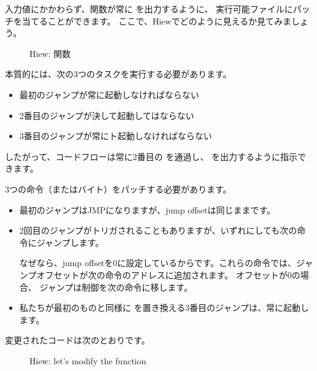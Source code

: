 



\clearpage
{}

入力値にかかわらず、関数が常に を出力するように、
実行可能ファイルにパッチを当てることができます。 
ここで、Hiewでどのように見えるか見てみましょう。

\begin{figure}[H]
\centering
{}
\caption{Hiew:  関数}
\label{fig:jcc_hiew_1}
\end{figure}

本質的には、次の3つのタスクを実行する必要があります。
\begin{itemize}
\item 最初のジャンプが常に起動しなければならない
\item 2番目のジャンプが決して起動してはならない
\item 3番目のジャンプが常にト起動しなければならない
\end{itemize}

したがって、コードフローは常に2番目の \printf を通過し、 を出力するように指示できます。 

3つの命令（またはバイト）をパッチする必要があります。

\begin{itemize}
\item 最初のジャンプはJMPになりますが、\gls{jump offset}は同じままです。

\item 
2回目のジャンプがトリガされることもありますが、いずれにしても次の命令にジャンプします。

なぜなら、\gls{jump offset}を0に設定しているからです。これらの命令では、ジャンプオフセットが次の命令のアドレスに追加されます。 
オフセットが0の場合、
ジャンプは制御を次の命令に移します。

\item 
私たちが最初のものと同様に \JMP を置き換える3番目のジャンプは、常に起動します。

\end{itemize}

\clearpage
変更されたコードは次のとおりです。

\begin{figure}[H]
\centering
{}
\caption{Hiew: let's modify the  function}
\label{fig:jcc_hiew_2}
\end{figure}


